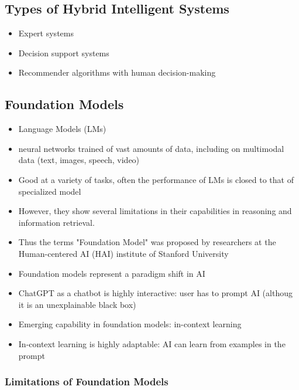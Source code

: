 \subsection{Types of Hybrid Intelligent Systems}

\begin{itemize}
    \item Expert systems 
    \item Decision support systems
    \item Recommender algorithms with human decision-making
\end{itemize}


\subsection{Foundation Models}

\begin{itemize}
    \item Language Models (LMs)
    \item neural networks trained of vast amounts of data, including on multimodal data (text, images, speech, video)
    \item Good at a variety of tasks, often the performance of LMs is closed to that of specialized model
    \item However, they show several limitations in their capabilities in reasoning and information retrieval. 
    \item Thus the terms "Foundation Model" was proposed by researchers at the Human-centered AI (HAI) institute of Stanford University
\end{itemize}

\begin{itemize}
    \item Foundation models represent a paradigm shift in AI
    \item ChatGPT as a chatbot is highly interactive: user has to prompt AI (althoug it is an unexplainable black box)
    \item Emerging capability in foundation models: in-context learning 
    \item In-context learning is highly adaptable: AI can learn from examples in the prompt 
\end{itemize}

\subsubsection{Limitations of Foundation Models}

